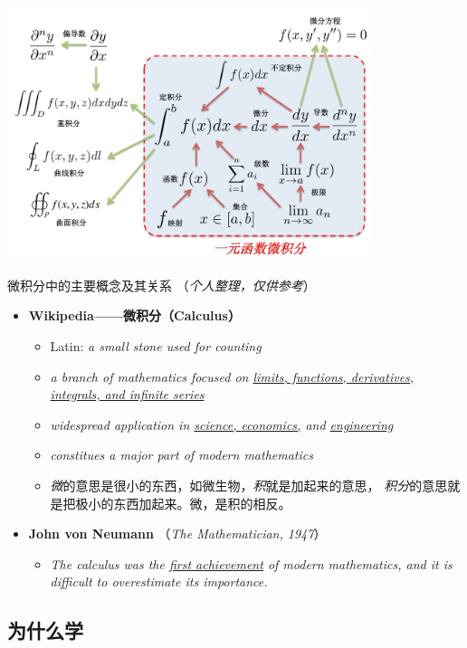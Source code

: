\begin{center}
	\includegraphics[width=0.8\textwidth]{./images/ch1/AM_architecture.jpg}
	
	{微积分中的主要概念及其关系\;
	（{\it 个人整理，仅供参考}）}
\end{center}

\begin{itemize}
	  \item {\bf Wikipedia——微积分（Calculus）} 
	\begin{itemize}
	  \item Latin: {\it a small stone used for counting}  
	  \item {\it a branch of mathematics focused on \underline{limits, functions,
	  	derivatives, integrals, and infinite series}} 
  	  \item {\it widespread application in \underline{science, economics,} 
  	  and \underline{engineering}} 
	  \item {\it constitues a major part of modern mathematics}
	  \item {\it 微}的意思是很小的东西，如微生物，{\it 积}就是加起来的意思，
	  {\it 积分}的意思就是把极小的东西加起来。微，是积的相反。 
	\end{itemize}
	\item {\bf John von Neumann} （{\small\it The Mathematician, 1947}）
	\begin{itemize}
	  \item {\it The calculus was the \underline{first achievement} of modern
	  mathematics, and it is difficult to overestimate its importance.}
	\end{itemize} 
\end{itemize}

\subsection{为什么学}

